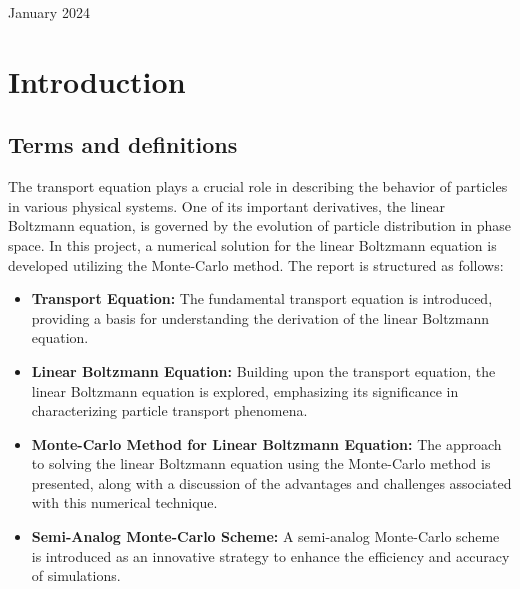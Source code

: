 \documentclass[a4paper, 11pt]{article}
\begin{document}
\begin{titlepage}
		\vspace{0,5cm}
		
		{\large January 2024} %
		
		
		
		
		\vfill %
		
	\end{titlepage}
	
\tableofcontents

\newpage
	
\section{Introduction}



\subsection{Terms and definitions}

The transport equation plays a crucial role in describing the behavior of particles in various physical systems. One of its important derivatives, the linear Boltzmann equation, is governed by the evolution of particle distribution in phase space. In this project, a numerical solution for the linear Boltzmann equation is developed utilizing the Monte-Carlo method. The report is structured as follows:

\begin{itemize}
	\item \textbf{Transport Equation:} The fundamental transport equation is introduced, providing a basis for understanding the derivation of the linear Boltzmann equation.
	
	\item \textbf{Linear Boltzmann Equation:} Building upon the transport equation, the linear Boltzmann equation is explored, emphasizing its significance in characterizing particle transport phenomena.
	
	\item \textbf{Monte-Carlo Method for Linear Boltzmann Equation:} The approach to solving the linear Boltzmann equation using the Monte-Carlo method is presented, along with a discussion of the advantages and challenges associated with this numerical technique.
	
	\item \textbf{Semi-Analog Monte-Carlo Scheme:} A semi-analog Monte-Carlo scheme is introduced as an innovative strategy to enhance the efficiency and accuracy of simulations.
\end{itemize}
\end{document}
